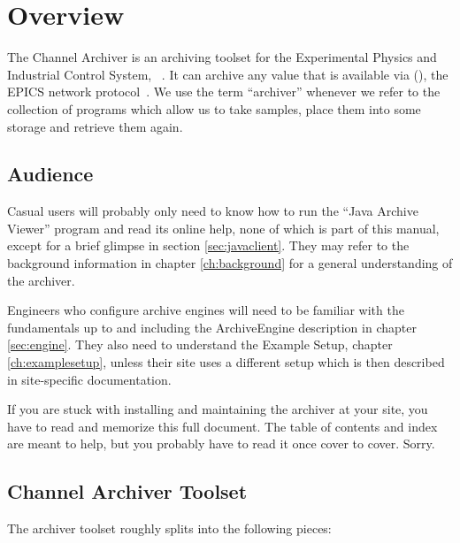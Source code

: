 \chapter{Overview}
The Channel Archiver is an archiving toolset for the Experimental Physics
and Industrial Control System, ~\cite{ANLweb}.
It can archive any value that is available via 
(), the EPICS network protocol~\cite{hill89}.
We use the term ``archiver'' whenever we refer to the collection of
programs which allow us to take samples, place them into some storage
and retrieve them again.

\section{Audience}
Casual users will probably only need to know how to run the ``Java Archive
Viewer'' program and read its online help,
none of which is part of this manual, except for a brief glimpse in 
section \ref{sec:javaclient}.
They may refer to the background information in chapter
\ref{ch:background} for a general understanding of the archiver.

Engineers who configure archive engines will need to be familiar with
the fundamentals up to and including the ArchiveEngine description in
chapter \ref{sec:engine}. They also need to understand the Example
Setup, chapter \ref{ch:examplesetup}, unless their site uses a
different setup which is then described in site-specific
documentation.

If you are stuck with installing and maintaining the archiver at your
site, you have to read and memorize this full document. The table of
contents and index are meant to help, but you probably have to read it
once cover to cover. Sorry.

\section{Channel Archiver Toolset}
The archiver toolset roughly splits into the following pieces:


